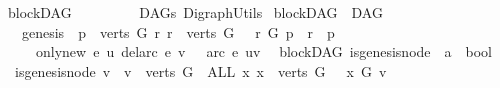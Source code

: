 %
\begin{isabellebody}%
%
%
\isadelimtheory
\isanewline
\isanewline
%
\endisadelimtheory
%
\isatagtheory
{}\isamarkupfalse%
\ blockDAG\ \ \ \ \ \ \isanewline
\ \ \ DAGs\ DigraphUtils\isanewline
{}%
\endisatagtheory
{\isafoldtheory}%
%
\isadelimtheory
%
\endisadelimtheory
%
\isadelimdocument
%
\endisadelimdocument
%
\isatagdocument
%
\isamarkuptrue%
%
\endisatagdocument
{\isafolddocument}%
%
\isadelimdocument
%
\endisadelimdocument
{}\isamarkupfalse%
\ blockDAG\ {\isacharequal}{\kern0pt}\ DAG\ \ {\isacharplus}{\kern0pt}\isanewline
\ \ \ genesis{\isacharcolon}{\kern0pt}\ \ {\isachardoublequoteopen}{\isasymexists}p\ {\isasymin}\ verts\ G{\isachardot}{\kern0pt}\ {\isasymforall}r{\isachardot}{\kern0pt}\ r\ {\isasymin}\ verts\ G\ \ {\isasymlongrightarrow}\ {\isacharparenleft}{\kern0pt}r\ {\isasymrightarrow}\isactrlsup {\isacharplus}{\kern0pt}\isactrlbsub G\isactrlesub \ p\ {\isasymor}\ r\ {\isacharequal}{\kern0pt}\ p{\isacharparenright}{\kern0pt}{\isachardoublequoteclose}\ \ \ \ \ \ \ \isanewline
\ \ \ \ \ only{\isacharunderscore}{\kern0pt}new{\isacharcolon}{\kern0pt}\ {\isachardoublequoteopen}{\isasymforall}e{\isachardot}{\kern0pt}\ {\isacharparenleft}{\kern0pt}u\ {\isasymrightarrow}\isactrlsup {\isacharplus}{\kern0pt}\isactrlbsub {\isacharparenleft}{\kern0pt}del{\isacharunderscore}{\kern0pt}arc\ e{\isacharparenright}{\kern0pt}\isactrlesub \ v{\isacharparenright}{\kern0pt}\ {\isasymlongrightarrow}\ {\isasymnot}\ arc\ e\ {\isacharparenleft}{\kern0pt}u{\isacharcomma}{\kern0pt}v{\isacharparenright}{\kern0pt}{\isachardoublequoteclose}%
\isadelimdocument
%
\endisadelimdocument
%
\isatagdocument
%
\isamarkuptrue%
%
\endisatagdocument
{\isafolddocument}%
%
\isadelimdocument
%
\endisadelimdocument
{}\isamarkupfalse%
\ {\isacharparenleft}{\kern0pt}\ blockDAG{\isacharparenright}{\kern0pt}\ is{\isacharunderscore}{\kern0pt}genesis{\isacharunderscore}{\kern0pt}node\ {\isacharcolon}{\kern0pt}{\isacharcolon}{\kern0pt}\ {\isachardoublequoteopen}{\isacharprime}{\kern0pt}a\ {\isasymRightarrow}\ bool{\isachardoublequoteclose}\ \isanewline
\ \ {\isachardoublequoteopen}is{\isacharunderscore}{\kern0pt}genesis{\isacharunderscore}{\kern0pt}node\ v\ {\isacharequal}{\kern0pt}\ {\isacharparenleft}{\kern0pt}{\isacharparenleft}{\kern0pt}v\ {\isasymin}\ verts\ G{\isacharparenright}{\kern0pt}\ {\isasymand}\ {\isacharparenleft}{\kern0pt}ALL\ x{\isachardot}{\kern0pt}\ {\isacharparenleft}{\kern0pt}x\ {\isasymin}\ verts\ G{\isacharparenright}{\kern0pt}\ {\isasymlongrightarrow}\ \ x\ {\isasymrightarrow}\isactrlsup {\isacharasterisk}{\kern0pt}\isactrlbsub G\isactrlesub \ v{\isacharparenright}{\kern0pt}{\isacharparenright}{\kern0pt}{\isachardoublequoteclose}\isanewline

\end{isabellebody}
